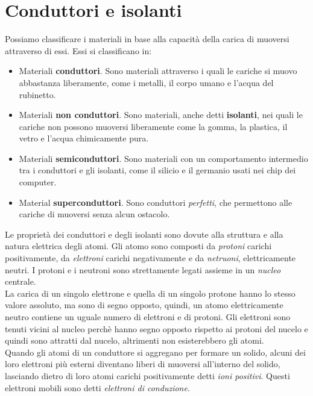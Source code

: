\documentclass[12pt]{report}
\begin{document}
	\section{Conduttori e isolanti}
	Possiamo classificare i materiali in base alla capacità della carica di muoversi attraverso di essi. Essi si classificano in:
	\begin{itemize}
		\item Materiali \textbf{conduttori}. Sono materiali attraverso i quali le cariche si muovo abbastanza liberamente, come i metalli, il corpo umano e l'acqua del rubinetto.
		\item Materiali \textbf{non conduttori}. Sono materiali, anche detti \textbf{isolanti}, nei quali le cariche non possono muoversi liberamente come la gomma, la plastica, il vetro e l'acqua chimicamente pura.
		\item Materiali \textbf{semiconduttori}. Sono materiali con un comportamento intermedio tra i conduttori e gli isolanti, come il silicio e il germanio usati nei chip dei computer.
		\item Material \textbf{superconduttori}. Sono conduttori \textit{perfetti}, che permettono alle cariche di muoversi senza alcun ostacolo.
	\end{itemize}
	Le proprietà dei conduttori e degli isolanti sono dovute alla struttura e alla natura elettrica degli atomi. Gli atomo sono composti da \textit{protoni} carichi positivamente, da \textit{elettroni} carichi negativamente e da \textit{netruoni}, elettricamente neutri. I protoni e i neutroni sono strettamente legati assieme in un \textit{nucleo} centrale. \\
	La carica di un singolo elettrone e quella di un singolo protone hanno lo stesso valore assoluto, ma sono di segno opposto, quindi, un atomo elettricamente neutro contiene un uguale numero di elettroni e di protoni. Gli elettroni sono tenuti vicini al nucleo perchè hanno segno opposto rispetto ai protoni del nucelo e quindi sono attratti dal nucelo, altrimenti non esisterebbero gli atomi. \\
	Quando gli atomi di un conduttore si aggregano per formare un solido, alcuni dei loro elettroni più esterni diventano liberi di muoversi all'interno del solido, lasciando dietro di loro atomi carichi positivamente detti \textit{ioni positivi}. Questi elettroni mobili sono detti \textit{elettroni di conduzione}.
\end{document}
